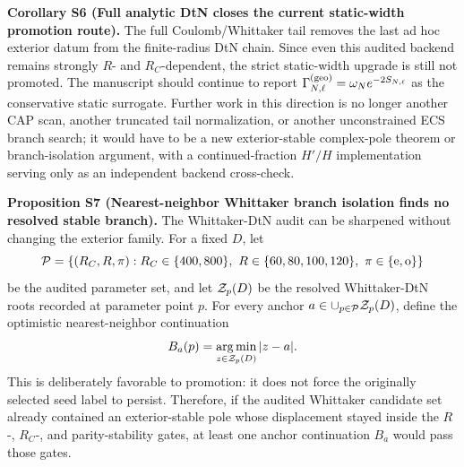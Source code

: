 \documentclass[aps,prd,onecolumn,notitlepage,nofootinbib,superscriptaddress,11pt,floatfix]{revtex4-2}
\begin{document}
\medskip\noindent\textbf{Corollary S6 (Full analytic DtN closes the current static-width promotion route).}
The full Coulomb/Whittaker tail removes the last ad hoc exterior datum from the finite-radius DtN chain.  Since even this audited backend remains strongly \(R\)- and \(R_C\)-dependent, the strict static-width upgrade is still not promoted.  The manuscript should continue to report \(\Gamma_{N,\ell}^{\rm(geo)}=\omega_Ne^{-2S_{N,\ell}}\) as the conservative static surrogate.  Further work in this direction is no longer another CAP scan, another truncated tail normalization, or another unconstrained ECS branch search; it would have to be a new exterior-stable complex-pole theorem or branch-isolation argument, with a continued-fraction \(H'/H\) implementation serving only as an independent backend cross-check.

\medskip\noindent\textbf{Proposition S7 (Nearest-neighbor Whittaker branch isolation finds no resolved stable branch).}
The Whittaker-DtN audit can be sharpened without changing the exterior family.  For a fixed \(D\), let
\[
{\cal P}=\{(R_C,R,\pi):R_C\in\{400,800\},\ R\in\{60,80,100,120\},\ \pi\in\{{\rm e},{\rm o}\}\}
\]
be the audited parameter set, and let \({\cal Z}_p(D)\) be the resolved Whittaker-DtN roots recorded at parameter point \(p\).  For every anchor \(a\in\cup_{p\in{\cal P}}{\cal Z}_p(D)\), define the optimistic nearest-neighbor continuation
\[
B_a(p)=\operatorname*{arg\,min}_{z\in{\cal Z}_p(D)} |z-a|.
\]
This is deliberately favorable to promotion: it does not force the originally selected seed label to persist.  Therefore, if the audited Whittaker candidate set already contained an exterior-stable pole whose displacement stayed inside the \(R\)-, \(R_C\)-, and parity-stability gates, at least one anchor continuation \(B_a\) would pass those gates.
\end{document}
